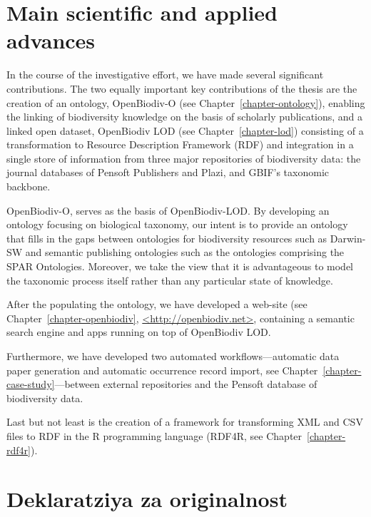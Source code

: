 \section{Main scientific and applied advances}

In the course of the investigative effort, we have made several significant contributions. The two equally important key contributions of the thesis are the creation of an ontology, OpenBiodiv-O (see Chapter~\ref{chapter-ontology}), enabling the linking of biodiversity knowledge on the basis of scholarly publications, and a linked open dataset, OpenBiodiv LOD (see Chapter~\ref{chapter-lod}) consisting of a transformation to Resource Description Framework (RDF) and integration in a single store of information from three major repositories of biodiversity data: the journal databases of Pensoft Publishers and Plazi, and GBIF's taxonomic backbone.

OpenBiodiv-O, serves as the basis of OpenBiodiv-LOD. By developing an ontology focusing on biological taxonomy, our intent is to provide an ontology that fills in the gaps between ontologies for biodiversity resources such as Darwin-SW and semantic publishing ontologies such as the ontologies comprising the SPAR Ontologies. Moreover, we take the view that it is advantageous to model the taxonomic process itself rather than any particular state of knowledge.

After the populating the ontology, we have developed a web-site (see Chapter~\ref{chapter-openbiodiv}, \href{http://openbiodiv.net}{<http://openbiodiv.net>}, containing a semantic search engine and apps running on top of OpenBiodiv LOD.

Furthermore, we have developed two automated workflows---automatic data paper generation and automatic occurrence record import, see Chapter~\ref{chapter-case-study}---between external repositories and the Pensoft database of biodiversity data.

Last but not least is the creation of a framework for transforming XML and CSV files to RDF in the R programming language (RDF4R, see Chapter~\ref{chapter-rdf4r}).

\section{Deklaratziya za originalnost}